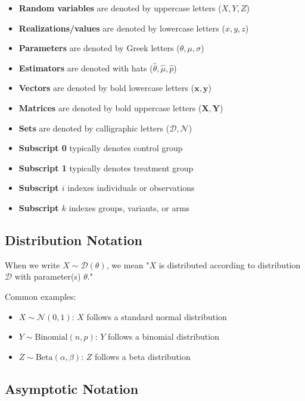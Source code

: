 \begin{itemize}
    \item \textbf{Random variables} are denoted by uppercase letters ($X, Y, Z$)
    \item \textbf{Realizations/values} are denoted by lowercase letters ($x, y, z$)
    \item \textbf{Parameters} are denoted by Greek letters ($\theta, \mu, \sigma$)
    \item \textbf{Estimators} are denoted with hats ($\hat{\theta}, \hat{\mu}, \hat{p}$)
    \item \textbf{Vectors} are denoted by bold lowercase letters ($\mathbf{x}, \mathbf{y}$)
    \item \textbf{Matrices} are denoted by bold uppercase letters ($\mathbf{X}, \mathbf{Y}$)
    \item \textbf{Sets} are denoted by calligraphic letters ($\mathcal{D}, \mathcal{N}$)
    \item \textbf{Subscript 0} typically denotes control group
    \item \textbf{Subscript 1} typically denotes treatment group
    \item \textbf{Subscript $i$} indexes individuals or observations
    \item \textbf{Subscript $k$} indexes groups, variants, or arms
\end{itemize}

\subsection{Distribution Notation}

When we write $X \sim \mathcal{D}(\theta)$, we mean "$X$ is distributed according to distribution $\mathcal{D}$ with parameter(s) $\theta$."

Common examples:
\begin{itemize}
    \item $X \sim \mathcal{N}(0, 1)$: $X$ follows a standard normal distribution
    \item $Y \sim \text{Binomial}(n, p)$: $Y$ follows a binomial distribution
    \item $Z \sim \text{Beta}(\alpha, \beta)$: $Z$ follows a beta distribution
\end{itemize}

\subsection{Asymptotic Notation}

